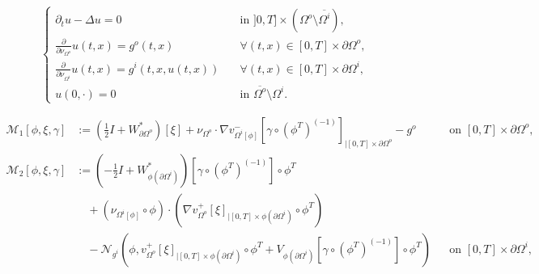 \documentclass[10pt,a4paper]{amsart}
\begin{document}
\begin{equation}\label{princeq 2}
\begin{cases}
    \partial_t u - \Delta u = 0 & \quad\text{in } ]0,T] \times (\Omega^o \setminus \overline{\Omega^i}), 
    \\
    \frac{\partial}{\partial\nu_{\Omega^o}} u(t,x) = g^o(t,x)& \quad \forall (t,x)\in [0,T] \times \partial \Omega^o, 
    \\
    \frac{\partial}{\partial\nu_{\Omega^i}} u (t,x) = g^i(t,x,u(t,x)) & \quad \forall (t,x)\in  [0,T] \times \partial \Omega^i,
    \\
    u(0,\cdot)=0 & \quad \text{in } \overline{\Omega^o} \setminus \Omega^i.
    \end{cases}
\end{equation}

\begin{equation}\label{eq M Robin}
\begin{aligned}
\mathcal{M}_1[\phi,\xi,\gamma]
&:=\left(\frac12I+W_{\partial\Omega^o}^*\right)[\xi]
+\nu_{\Omega^o}\cdot\nabla v^-_{\Omega^i[\phi]}
\left[\gamma\circ(\phi^T)^{(-1)}\right]_{|[0,T]\times\partial\Omega^o}
-g^o
&&\text{on }[0,T]\times\partial\Omega^o,
\\
\mathcal{M}_2[\phi,\xi,\gamma]
&:=\left(-\frac12I+W_{\phi(\partial\Omega^i)}^*\right)
\left[\gamma\circ(\phi^T)^{(-1)}\right]\circ\phi^T
\\
&\quad +(\nu_{\Omega^i[\phi]}\circ\phi)\cdot
\left(\nabla v^+_{\Omega^o}[\xi]_{|[0,T]\times\phi(\partial\Omega^i)}\circ\phi^T\right)
\\
&\quad -\mathcal{N}_{g^i} \left( \phi, v^+_{\Omega^o}[\xi]_{|[0,T]\times\phi(\partial\Omega^i)}\circ\phi^T + V_{\phi(\partial\Omega^i)} \left[\gamma\circ(\phi^T)^{(-1)}\right]\circ\phi^T \right)
&&\text{on }[0,T]\times\partial\Omega^i,
\end{aligned}
\end{equation}
\end{document}
